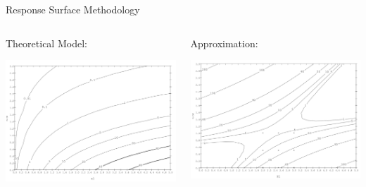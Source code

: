 \documentclass[14pt]{beamer}
\begin{document}
\begin{frame}{Response Surface Methodology}

\begin{columns}
    \begin{column}{0.5\textwidth}
    Theoretical Model:

      \includegraphics[width=1.1\textwidth]{actualgraphout.png}
    \end{column}
    \begin{column}{0.5\textwidth}
      Approximation:

      \includegraphics[width=1.1\textwidth]{modelgraphout.png}
    \end{column}
  \end{columns}

\end{frame}
\end{document}
